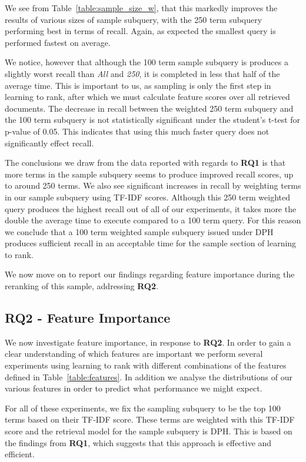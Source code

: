 \documentclass{mpaper}
\begin{document}
We see from Table~\ref{table:sample_size_w}, that this markedly improves the results of various sizes of sample subquery, with the 250 term subquery performing best in terms of recall. Again, as expected the smallest query is performed fastest on average.

We notice, however that although the 100 term sample subquery is produces a slightly worst recall than \textit{All} and \textit{250}, it is completed in less that half of the average time. This is important to us, as sampling is only the first step in learning to rank, after which we must calculate feature scores over all retrieved documents. The decrease in recall between the weighted 250 term subquery and the 100 term subquery is not statistically significant under the student's t-test for p-value of 0.05. This indicates that using this much faster query does not significantly effect recall.

The conclusions we draw from the data reported with regards to \textbf{RQ1} is that more terms in the sample subquery seems to produce improved recall scores, up to around 250 terms. We also see significant increases in recall by weighting terms in our sample subquery using TF-IDF scores. Although this 250 term weighted query produces the highest recall out of all of our experiments, it takes more the double the average time to execute compared to a 100 term query.
For this reason we conclude that a 100 term weighted sample subquery issued under DPH produces sufficient recall in an acceptable time for the sample section of learning to rank.

We now move on to report our findings regarding feature importance during the reranking of this sample, addressing \textbf{RQ2}.

\subsection{RQ2 - Feature Importance} \label{sec:RQ2}
We now investigate feature importance, in response to \textbf{RQ2}. In order to gain a clear understanding of which features are important we perform several experiments using learning to rank with different combinations of the features defined in Table~\ref{table:features}.
In addition we analyse the distributions of our various features in order to predict what performance we might expect.

For all of these experiments, we fix the sampling subquery to be the top 100 terms based on their TF-IDF score. These terms are weighted with this TF-IDF score and the retrieval model for the sample subquery is DPH. This is based on the findings from \textbf{RQ1}, which suggests that this approach is effective and efficient.
\end{document}
